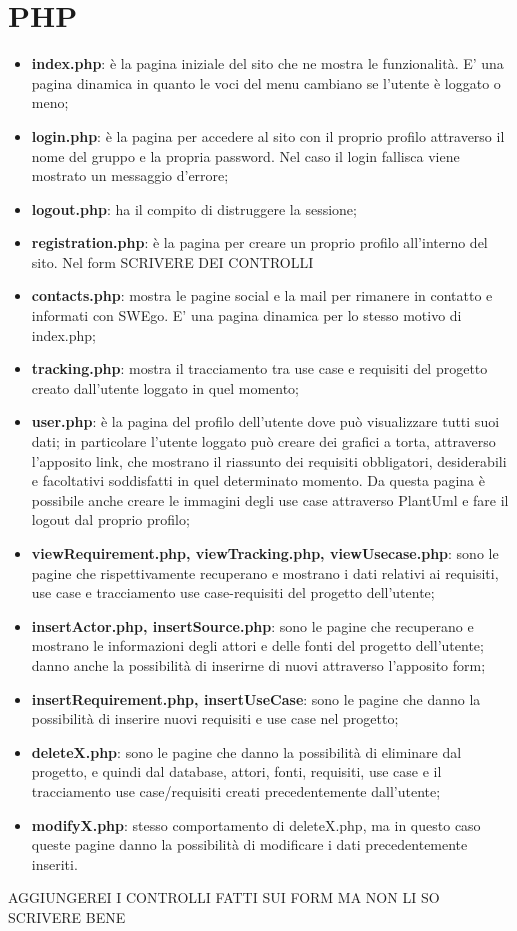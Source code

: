 \section{PHP}

\begin{itemize}
	\item \textbf{index.php}: è la pagina iniziale del sito che ne mostra le funzionalità. E' una pagina dinamica in quanto le voci del menu cambiano se l'utente è loggato o meno;
	\item \textbf{login.php}: è la pagina per accedere al sito con il proprio profilo attraverso il nome del gruppo e la propria password. Nel caso il login fallisca viene mostrato un messaggio d'errore;
	\item \textbf{logout.php}: ha il compito di distruggere la sessione;
	\item \textbf{registration.php}: è la pagina per creare un proprio profilo all'interno del sito. Nel form SCRIVERE DEI CONTROLLI
	\item \textbf{contacts.php}: mostra le pagine social e la mail per rimanere in contatto e informati con SWEgo. E' una pagina dinamica per lo stesso motivo di index.php;
	\item \textbf{tracking.php}: mostra il tracciamento tra use case e requisiti del progetto creato dall'utente loggato in quel momento;
	\item \textbf{user.php}: è la pagina del profilo dell'utente dove può visualizzare tutti suoi dati; in particolare l'utente loggato può creare dei grafici a torta, attraverso l'apposito link, che mostrano il riassunto dei requisiti obbligatori, desiderabili e facoltativi soddisfatti in quel determinato momento. Da questa pagina è possibile anche creare le immagini degli use case attraverso PlantUml e fare il logout dal proprio profilo;
	\item \textbf{viewRequirement.php, viewTracking.php, viewUsecase.php}: sono le pagine che rispettivamente recuperano e mostrano i dati relativi ai requisiti, use case e tracciamento use case-requisiti del progetto dell'utente;
	\item \textbf{insertActor.php, insertSource.php}: sono le pagine che recuperano e mostrano le informazioni degli attori e delle fonti del progetto dell'utente; danno anche la possibilità di inserirne di nuovi attraverso l'apposito form;
	\item \textbf{insertRequirement.php, insertUseCase}: sono le pagine che danno la possibilità di inserire nuovi requisiti e use case nel progetto;
	\item \textbf{deleteX.php}: sono le pagine che danno la possibilità di eliminare dal progetto, e quindi dal database, attori, fonti, requisiti, use case e il tracciamento use case/requisiti creati precedentemente dall'utente; 
	\item \textbf{modifyX.php}: stesso comportamento di deleteX.php, ma in questo caso queste pagine danno la possibilità di modificare i dati precedentemente inseriti.
\end{itemize}

AGGIUNGEREI I CONTROLLI FATTI SUI FORM MA NON LI SO SCRIVERE BENE